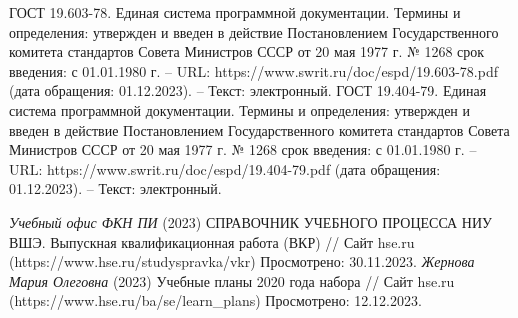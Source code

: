 \documentclass{article}
\begin{document}
\begin{thebibliography}{}
         ГОСТ 19.603-78. Единая система программной документации. Термины и определения: утвержден и введен в действие Постановлением Государственного комитета стандартов Совета Министров СССР от 20 мая 1977 г. № 1268 срок введения: с 01.01.1980 г. – URL: https://www.swrit.ru/doc/espd/19.603-78.pdf (дата обращения: 01.12.2023). – Текст: электронный.
         ГОСТ 19.404-79. Единая система программной документации. Термины и определения: утвержден и введен в действие Постановлением Государственного комитета стандартов Совета Министров СССР от 20 мая 1977 г. № 1268 срок введения: с 01.01.1980 г. – URL: https://www.swrit.ru/doc/espd/19.404-79.pdf (дата обращения: 01.12.2023). – Текст: электронный.

         \textit{Учебный офис ФКН ПИ} (2023) СПРАВОЧНИК УЧЕБНОГО ПРОЦЕССА НИУ ВШЭ. Выпускная квалификационная работа (ВКР) // Сайт hse.ru (https://www.hse.ru/studyspravka/vkr) Просмотрено: 30.11.2023.
         \textit{Жернова Мария Олеговна} (2023) Учебные планы 2020 года набора // Сайт hse.ru (https://www.hse.ru/ba/se/learn\_plans) Просмотрено: 12.12.2023.


\end{thebibliography}
\end{document}
